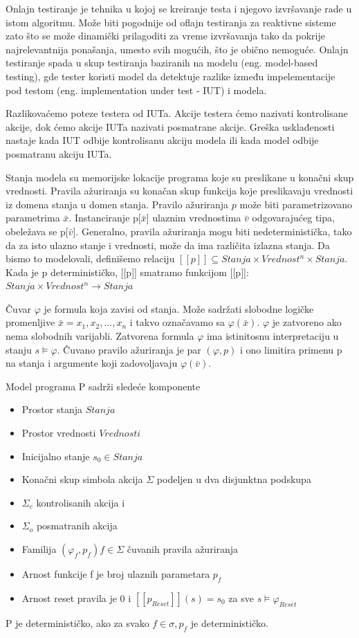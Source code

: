 \documentclass[a4paper]{article}
\theoremstyle{definition}
\begin{document}
{Onlajn testiranje je tehnika u kojoj se kreiranje testa i njegovo izvršavanje rade u istom algoritmu. Može biti pogodnije od oflajn testiranja za reaktivne sisteme zato što se može dinamički prilagoditi za vreme izvršavanja tako da pokrije najrelevantnija ponašanja, umesto svih mogućih, što je obično nemoguće. Onlajn testiranje spada u skup testiranja baziranih na modelu (eng. model-based testing), gde tester koristi model da detektuje razlike između impelementacije pod testom (eng. implementation under test - IUT) i modela.

Razlikovaćemo poteze testera od IUTa. Akcije testera ćemo nazivati kontrolisane akcije, dok ćemo akcije IUTa nazivati posmatrane akcije. Greška usklađenosti nastaje kada IUT odbije kontrolisanu akciju modela ili kada model odbije posmatranu akciju IUTa.

Stanja modela su memorijske lokacije programa koje su preslikane u konačni skup vrednosti. 
Pravila ažuriranja su konačan skup funkcija koje preslikavaju vrednosti iz domena stanja u domen stanja. Pravilo ažuriranja $p$ može biti parametrizovano parametrima $\bar{x}$.
Instanciranje p[$\bar{x}$] ulaznim vrednostima $\bar{v}$ odgovarajućeg tipa, obeležava se p[$\bar{v}$].
Generalno, pravila ažuriranja mogu biti nedeterministička, tako da za isto ulazno stanje i vrednosti, može da ima različita izlazna stanja. Da bismo to modelovali, definišemo relaciju $[[p]] \subseteq Stanja \times Vrednost^n \times Stanja$.
Kada je p determinističko, [[p]] smatramo funkcijom [[p]]: $Stanja \times Vrednost^n  \rightarrow Stanja$

Čuvar $\varphi$ je formula koja zavisi od stanja. Može sadržati slobodne logičke promenljive $\bar{x} = x_1, x_2,..., x_n$ i takvo označavamo sa $\varphi(\bar{x})$. $\varphi$ je zatvoreno ako nema slobodnih varijabli. Zatvorena formula $\varphi$ ima istinitosnu interpretaciju u stanju $s \models \varphi$. Čuvano pravilo ažuriranja je par $(\varphi, p)$ i ono limitira primenu p na stanja i argumente koji zadovoljavaju $\varphi(\bar{v})$.

Model programa P sadrži sledeće komponente
\begin{itemize}
\item Prostor stanja $Stanja$
\item Prostor vrednosti $Vrednosti$
\item Inicijalno stanje $s_0 \in Stanja$
\item Konačni skup simbola akcija $\Sigma$ podeljen u dva disjunktna podskupa
	\item $\Sigma_c$ kontrolisanih akcija i
	\item $\Sigma_o$ posmatranih akcija
\item Familija $(\varphi_f, p_f) f \in \Sigma$ čuvanih pravila ažuriranja
	\item Arnost funkcije f je broj ulaznih parametara $p_f$
	\item Arnost reset pravila je 0 i $[[p_{Reset}]](s) = s_0$ za sve $s \models \varphi_{Reset}$
\end{itemize}
P je determinističko, ako za svako $f \in \sigma, p_f$ je determinističko. \\

}
\end{document}
